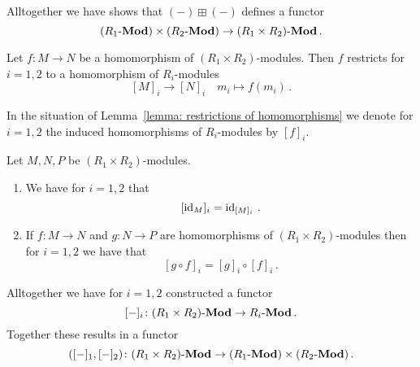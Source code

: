 \begin{remark}
  \label{remark: functor out of product}
  Alltogether we have shows that $(-) \boxplus (-)$ defines a functor
  \[
        (R_1\text{-}\mathbf{Mod}) \times (R_2\text{-}\mathbf{Mod})
    \to (R_1 \times R_2)\text{-}\mathbf{Mod} \,.
  \]
\end{remark}


\begin{lemma}
  \label{lemma: restrictions of homomorphisms}
  Let $f \colon M \to N$ be a homomorphism of $(R_1 \times R_2)$-modules.
  Then $f$ restricts for $i = 1, 2$ to a homomorphism of $R_i$-modules
  \[
            [M]_i
    \to     [N]_i
    \quad   m_i
    \mapsto f(m_i) \,.
  \]
\end{lemma}


\begin{definition}
  In the situation of Lemma~\ref{lemma: restrictions of homomorphisms} we denote for $i = 1, 2$ the induced homomorphisms of $R_i$-modules by $[f]_i$.
\end{definition}


\begin{lemma}
  Let $M, N, P$ be $(R_1 \times R_2)$-modules.
  \begin{enumerate}
    \item
      We have for $i = 1, 2$ that
      \[
          [\operatorname{id}_M]_i
        = \operatorname{id}_{[M]_i} \,.
      \]
    \item
      If $f \colon M \to N$ and $g \colon N \to P$ are homomorphisms of $(R_1 \times R_2)$-modules then for $i = 1, 2$ we have that
      \[
          [g \circ f]_i
        = [g]_i \circ [f]_i \,.
      \]
  \end{enumerate}
\end{lemma}


\begin{remark}
  \label{remark: functor into product}
  Alltogether we have for $i = 1, 2$ constructed a functor
  \[
            [-]_i
    \colon  (R_1 \times R_2)\text{-}\mathbf{Mod}
    \to     R_i\text{-}\mathbf{Mod} \,.
  \]
  Together these results in a functor
  \[
            ([-]_1, [-]_2)
    \colon  (R_1 \times R_2)\text{-}\mathbf{Mod}
    \to     (R_1\text{-}\mathbf{Mod}) \times (R_2\text{-}\mathbf{Mod}) \,.
  \]
\end{remark}


